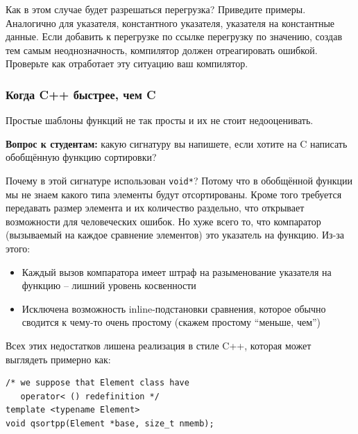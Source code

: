 \documentclass[a4paper,12pt,oneside]{article}
\newif\ifanswers
\begin{document}
Как в этом случае будет разрешаться перегрузка? Приведите примеры. Аналогично для указателя, константного указателя, указателя на константные данные. Если добавить к перегрузке по ссылке перегрузку по значению, создав тем самым неоднозначность, компилятор должен отреагировать ошибкой. Проверьте как отработает эту ситуацию ваш компилятор.

\subsubsection{Когда C++ быстрее, чем C}\label{CppBetterC}

Простые шаблоны функций не так просты и их не стоит недооценивать. 

\textbf{Вопрос к студентам:} какую сигнатуру вы напишете, если хотите на C написать обобщённую функцию сортировки? 

\ifanswers
Ответ: стандарт языка C99 регламентирует (пункт 7.20.5.2) следующую сигнатуру:

\begin{lstlisting}
void qsort(void *base, size_t nmemb, size_t size, 
           int (*compar)(const void *, const void *));
\end{lstlisting}
\fi

Почему в этой сигнатуре использован \lstinline!void*!? Потому что в обобщённой функции мы не знаем какого типа элементы будут отсортированы. Кроме того требуется передавать размер элемента и их количество раздельно, что открывает возможности для человеческих ошибок. Но хуже всего то, что компаратор (вызываемый на каждое сравнение элементов) это указатель на функцию. Из-за этого:

\begin{itemize}
\item Каждый вызов компаратора имеет штраф на разыменование указателя на функцию -- лишний уровень косвенности
\item Исключена возможность inline-подстановки сравнения, которое обычно сводится к чему-то очень простому (скажем простому ``меньше, чем'')
\end{itemize}

Всех этих недостатков лишена реализация в стиле C++, которая может выглядеть примерно как:

\begin{lstlisting}
/* we suppose that Element class have 
   operator< () redefinition */
template <typename Element>
void qsortpp(Element *base, size_t nmemb);
\end{lstlisting}
\end{document}
